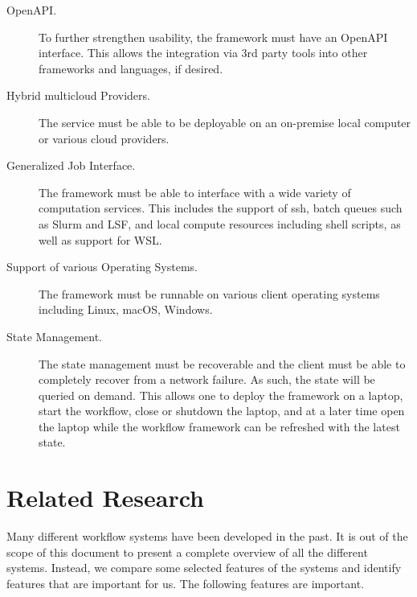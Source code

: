 \begin{description}
\item[OpenAPI.] To further strengthen usability, the framework must
have an OpenAPI interface. This allows the integration via 3rd party
tools into other frameworks and languages, if desired.

\item[Hybrid multicloud Providers.] The service must be able to be
deployable on an on-premise local computer or various cloud providers.

\item[Generalized Job Interface.] The framework must be able to
interface with a wide variety of computation services. This includes
the support of ssh, batch queues such as Slurm and LSF, and local
compute resources including shell scripts, as well as support for WSL.

\item[Support of various Operating Systems.] The framework must be
runnable on various client operating systems including Linux, macOS,
Windows.

\item[State Management.] The state management must be recoverable and
the client must be able to completely recover from a network failure.
As such, the state will be queried on demand. This allows one to
deploy the framework on a laptop, start the workflow, close or
shutdown the laptop, and at a later time open the laptop while the
workflow framework can be refreshed with the latest state.

\end{description}

% 


\section{Related Research}

Many different workflow systems have been developed in the past. It is
out of the scope of this document to present a complete overview of
all the different systems. Instead, we compare some selected features
of the systems and identify features that are important for us. The
following features are important.

